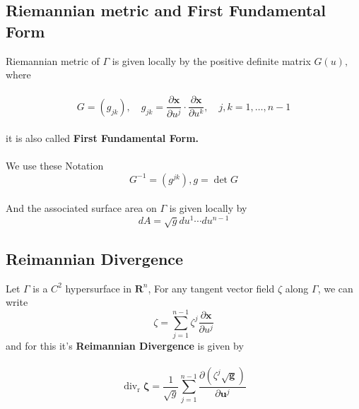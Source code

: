 \documentclass[oneside]{book}
\begin{document}
\subsection{Riemannian metric and First Fundamental Form}
\label{ss:12}
{Riemannian metric} of $\Gamma$ is given
locally by the positive definite matrix $G(u),$ where 
\\\\
  \begin{equation}
  \label{eq17}  
 G=\left(g_{j k}\right), \quad g_{j k}=\frac{\partial \mathbf{x}}{\partial u^{j}} \cdot \frac{\partial \mathbf{x}}{\partial u^{k}}, \quad j, k=1, \ldots, n-1     \end{equation}
\\
it is also called \textbf{First Fundamental Form.} \\\\
   We use these Notation \\
   \[ G^{-1}=\left(g^{j k}\right),   g=\operatorname{det}{G} \] \\
    And the associated surface area on  
   $\Gamma$ is given locally by \\


   \begin{equation}
   \label{eq18}  
    d A=\sqrt{g} d u^{1} \cdots d u^{n-1} 
\end{equation}

   
  







\subsection{Reimannian Divergence}
\label{ss:13}
Let $\Gamma$ is a $C^{2}$ hypersurface in $\mathbf{R}^{n}$,
For any tangent vector field $\zeta$ along $\Gamma$, we can write 
$$
\zeta=\sum_{j=1}^{n-1} \zeta^{j} \frac{\partial \mathbf{x}}{\partial u^{j}}
$$
and for this it's \textbf{Reimannian Divergence} is given by \\\\
\begin{equation}
\label{eq19}  
     \operatorname{div}_{\mathrm{r}} \boldsymbol{\zeta}=\frac{1}{\sqrt{g}} \sum_{j=1}^{n-1} \frac{\partial\left(\zeta^{j} \sqrt{\boldsymbol{g}}\right)}{\partial \boldsymbol{u}^{j}}  
\end{equation}
     
    
    
    
\end{document}

